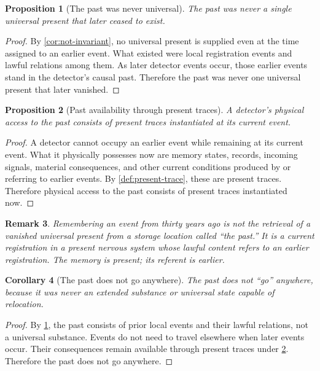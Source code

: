 \documentclass[12pt,onecolumn]{article}
\newtheorem{proposition}{Proposition}[section]
\newtheorem{corollary}[proposition]{Corollary}
\newtheorem{remark}[proposition]{Remark}
\begin{document}
\begin{proposition}[The past was never universal]
\label{prop:past-not-universal}
The past was never a single universal present that later ceased to exist.
\end{proposition}

\begin{proof}
By \cref{cor:not-invariant}, no universal present is supplied even at the time assigned to an earlier event. What existed were local registration events and lawful relations among them. As later detector events occur, those earlier events stand in the detector's causal past. Therefore the past was never one universal present that later vanished.
\end{proof}

\begin{proposition}[Past availability through present traces]
\label{prop:past-traces}
A detector's physical access to the past consists of present traces instantiated at its current event.
\end{proposition}

\begin{proof}
A detector cannot occupy an earlier event while remaining at its current event. What it physically possesses now are memory states, records, incoming signals, material consequences, and other current conditions produced by or referring to earlier events. By \cref{def:present-trace}, these are present traces. Therefore physical access to the past consists of present traces instantiated now.
\end{proof}

\begin{remark}
Remembering an event from thirty years ago is not the retrieval of a vanished universal present from a storage location called ``the past.'' It is a current registration in a present nervous system whose lawful content refers to an earlier registration. The memory is present; its referent is earlier.
\end{remark}

\begin{corollary}[The past does not go anywhere]
\label{cor:past-nowhere}
The past does not ``go'' anywhere, because it was never an extended substance or universal state capable of relocation.
\end{corollary}

\begin{proof}
By \cref{prop:past-not-universal}, the past consists of prior local events and their lawful relations, not a universal substance. Events do not need to travel elsewhere when later events occur. Their consequences remain available through present traces under \cref{prop:past-traces}. Therefore the past does not go anywhere.
\end{proof}
\end{document}
